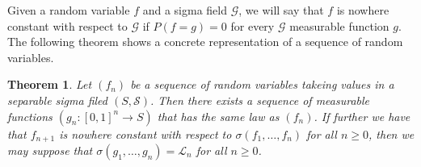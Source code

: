 \documentclass[12pt]{amsart}
\newtheorem{thmofothers}{Theorem}
\begin{document}
Given a random variable $f$ and a sigma field $\mathcal{G}$, we
will say that $f$ is nowhere constant with respect to
$\mathcal{G}$ if $P(f=g)=0$ for every $\mathcal{G}$ measurable
function $g$. The following theorem \cite{M2} shows a concrete
representation of a sequence of random variables.

\begin{thmofothers}
\label{t concrete} Let $(f_n)$ be a sequence of random variables
takeing values in a separable sigma filed $(S,\mathcal{S})$. Then
there exists a sequence of measurable functions
$(g_n:[0,1]^{n}\rightarrow S)$ that has the same law as $(f_n)$.
If further we have that $f_{n+1}$ is nowhere constant with respect
to $\sigma(f_1,\dots,f_n)$ for all $n \geq 0$, then we may suppose
that $\sigma(g_1,\dots,g_n)=\mathcal{L}_n$ for all $n \geq 0$.
\end{thmofothers}
\end{document}
